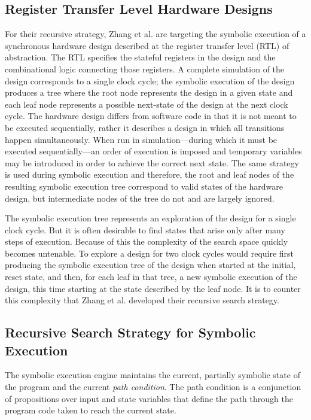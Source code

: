 \subsection{Register Transfer Level Hardware Designs}
For their recursive strategy, Zhang et al. are targeting the symbolic execution
of a synchronous hardware design described at the register transfer level (RTL)
of abstraction. The RTL specifies the stateful registers in the design and the
combinational logic connecting those registers. A complete simulation of the design
corresponds to a single clock cycle; the symbolic execution of the design
produces a tree where the root node represents the design in a given state and
each leaf node represents a possible next-state of the design at the next clock
cycle. The hardware design differs from software code in that it is not meant
to be executed sequentially, rather it describes a design in which all
transitions happen simultaneously. When run in simulation---during which it must
be executed sequentially---an order of execution
is imposed and temporary variables may be introduced in order to achieve the
correct next state. The same strategy is used during symbolic execution and therefore, the root and leaf nodes of the resulting symbolic
execution tree correspond to valid states of the hardware design, but
intermediate nodes of the tree do not and are largely ignored.

The symbolic execution tree represents an exploration of the design for a single
clock cycle. But it is often desirable to find states that arise only after many
steps of execution. Because of this the complexity of the search space quickly
becomes untenable. To explore a design for two clock cycles would require first
producing the symbolic execution tree of the design when started at the initial,
reset state, and then, for each leaf in that tree, a new symbolic execution of
the design, this time starting at the state described by the leaf node. It is to
counter this complexity that Zhang et al. developed their recursive search strategy.



\subsection{Recursive Search Strategy for Symbolic Execution}


The symbolic execution engine
maintains the current, partially symbolic state of the program and the current
\emph{path condition}. The path condition is a conjunction of propositions over
input and state variables that define the path through the program code taken to
reach the current state.


